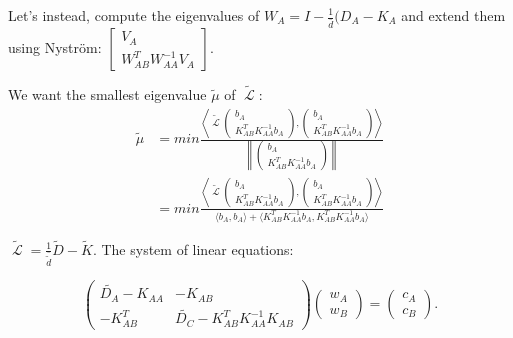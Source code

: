 \documentclass[]{article}
\DeclareMathOperator{\Lapl}{\mathcal{L}}
\begin{document}
Let's instead, compute the eigenvalues of \(W_A = I - \frac{1}{\bar{d}} (D_A - K_A\) and extend them using Nystr\"om: \(\begin{bmatrix}V_A \\ W_{AB}^T W_{AA}^{-1} V_A\end{bmatrix}\).

We want the smallest eigenvalue \(\tilde{\mu}\) of \(\tilde{\Lapl}\):
\begin{equation}
 \begin{split}
  \tilde{\mu} & = min \frac{\left\langle \tilde{\Lapl} \begin{pmatrix}b_A \\ K_{AB}^T K_{AA}^{-1} b_A\end{pmatrix}, \begin{pmatrix}b_A \\ K_{AB}^T K_{AA}^{-1} b_A\end{pmatrix} \right\rangle}{\left\| \begin{pmatrix}b_A \\ K_{AB}^T K_{AA}^{-1} b_A\end{pmatrix} \right\|} \\
             & = min \frac{\left\langle \tilde{\Lapl} \begin{pmatrix}b_A \\ K_{AB}^T K_{AA}^{-1} b_A\end{pmatrix}, \begin{pmatrix}b_A \\ K_{AB}^T K_{AA}^{-1} b_A\end{pmatrix} \right\rangle}{\langle b_A, b_A \rangle + \langle K_{AB}^T K_{AA}^{-1} b_A, K_{AB}^T K_{AA}^{-1} b_A \rangle}
 \end{split}
\end{equation}

\(\tilde{\Lapl} = \frac{1}{\bar{\tilde{d}}} \tilde{D} - \tilde{K}\). The system of linear equations:

\[\begin{pmatrix}
 \tilde{D_A} - K_{AA} & -K_{AB} \\
 -K_{AB}^T & \tilde{D_C} - K_{AB}^T K_{AA}^{-1} K_{AB}
\end{pmatrix}
\begin{pmatrix}
 w_A \\
 w_B
\end{pmatrix} = 
\begin{pmatrix}
 c_A \\
 c_B
\end{pmatrix}.\]
\end{document}
